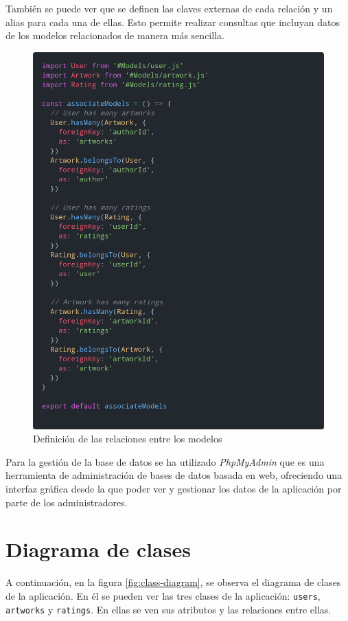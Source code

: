 También se puede ver que se definen las claves externas de cada relación y un alias para
cada una de ellas. Esto permite realizar consultas que incluyan datos de los modelos
relacionados de manera más sencilla.

\begin{figure}[H]
  \centering
  \includegraphics[width=1\textwidth]{img/associate-models}
  \caption{Definición de las relaciones entre los modelos}
  \label{fig:associate-models}
\end{figure}

Para la gestión de la base de datos se ha utilizado \textit{PhpMyAdmin} \cite{phpmyadmin}
que es una herramienta de administración de bases de datos basada en web, ofreciendo una
interfaz gráfica desde la que poder ver y gestionar los datos de la aplicación por parte
de los administradores.

\section{Diagrama de clases}
A continuación, en la figura \ref{fig:class-diagram}, se observa el diagrama de clases
de la aplicación. En él se pueden ver las tres clases de la aplicación: \texttt{users},
\texttt{artworks} y \texttt{ratings}. En ellas se ven sus atributos y las relaciones
entre ellas.

